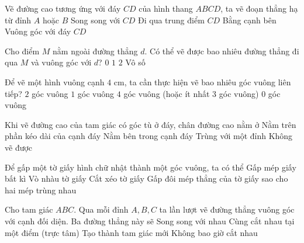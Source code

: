 \begin{ex} %
Vẽ đường cao tương ứng với đáy $CD$ của hình thang $ABCD$, ta vẽ đoạn thẳng hạ từ đỉnh $A$ hoặc $B$
\choice
{Song song với $CD$}
{Đi qua trung điểm $CD$}
{Bằng cạnh bên}
{\True Vuông góc với đáy $CD$}
\end{ex}

\begin{ex} %
Cho điểm $M$ nằm ngoài đường thẳng $d$. Có thể vẽ được bao nhiêu đường thẳng đi qua $M$ và vuông góc với $d$?
\choice
{$0$}
{\True $1$}
{$2$}
{Vô số}
\end{ex}

\begin{ex} %
Để vẽ một hình vuông cạnh $4\text{ cm}$, ta cần thực hiện vẽ bao nhiêu góc vuông liên tiếp?
\choice
{$2$ góc vuông}
{$1$ góc vuông}
{\True $4$ góc vuông (hoặc ít nhất 3 góc vuông)}
{$0$ góc vuông}
\end{ex}

\begin{ex} %
Khi vẽ đường cao của tam giác có góc tù ở đáy, chân đường cao nằm ở
\choice
{\True Nằm trên phần kéo dài của cạnh đáy}
{Nằm bên trong cạnh đáy}
{Trùng với một đỉnh}
{Không vẽ được}
\end{ex}

\begin{ex} %
Để gấp một tờ giấy hình chữ nhật thành một góc vuông, ta có thể
\choice
{Gấp mép giấy bất kì}
{Vò nhàu tờ giấy}
{Cắt xéo tờ giấy}
{\True Gấp đôi mép thẳng của tờ giấy sao cho hai mép trùng nhau}
\end{ex}

\begin{ex} %
Cho tam giác $ABC$. Qua mỗi đỉnh $A, B, C$ ta lần lượt vẽ đường thẳng vuông góc với cạnh đối diện. Ba đường thẳng này sẽ
\choice
{Song song với nhau}
{\True Cùng cắt nhau tại một điểm (trực tâm)}
{Tạo thành tam giác mới}
{Không bao giờ cắt nhau}
\end{ex}

